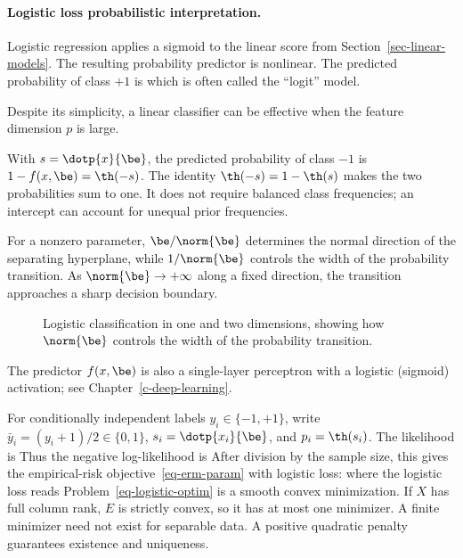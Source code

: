     
\paragraph{Logistic loss probabilistic interpretation.}

Logistic regression applies a sigmoid to the linear score from Section~\ref{sec-linear-models}. The resulting probability predictor is nonlinear. The predicted probability of class $+1$ is
which is often called the ``logit'' model.
 
Despite its simplicity, a linear classifier can be effective when the feature dimension $p$ is large.
 
With $s=\dotp{x}{\be}$, the predicted probability of class $-1$ is $1-f(x,\be)=\th(-s)$. The identity $\th(-s)=1-\th(s)$ makes the two probabilities sum to one. It does not require balanced class frequencies; an intercept can account for unequal prior frequencies.

For a nonzero parameter, $\be/\norm{\be}$ determines the normal direction of the separating hyperplane, while $1/\norm{\be}$ controls the width of the probability transition. As $\norm{\be} \rightarrow +\infty$ along a fixed direction, the transition approaches a sharp decision boundary.

\begin{figure}[tbp]
\centering
{}\hfill
{}
\caption{Logistic classification in one and two dimensions, showing how $\norm{\be}$ controls the width of the probability transition.}
\label{fig-logistic-sharpness}
\end{figure}

The predictor $f(x,\be)$ is also a single-layer perceptron with a logistic (sigmoid) activation; see Chapter~\ref{c-deep-learning}.

For conditionally independent labels $y_i\in\{-1,+1\}$, write $\bar y_i=(y_i+1)/2\in\{0,1\}$, $s_i=\dotp{x_i}{\be}$, and $p_i=\th(s_i)$. The likelihood is
Thus the negative log-likelihood is
After division by the sample size, this gives the empirical-risk objective~\eqref{eq-erm-param} with logistic loss:
where the logistic loss reads
Problem~\eqref{eq-logistic-optim} is a smooth convex minimization. If $X$ has full column rank, $E$ is strictly convex, so it has at most one minimizer. A finite minimizer need not exist for separable data. A positive quadratic penalty guarantees existence and uniqueness.


